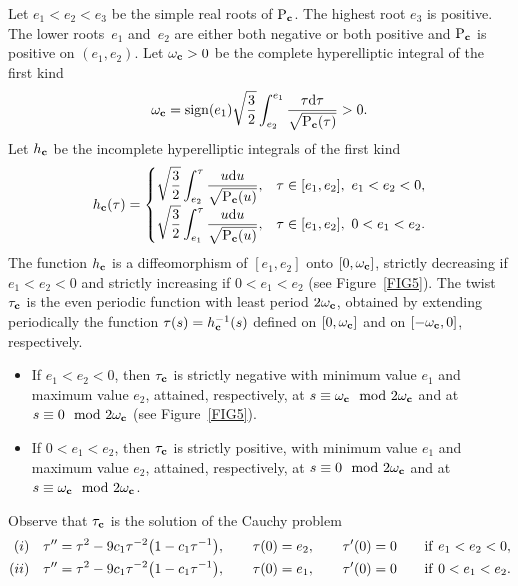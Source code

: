 \documentclass[10pt,a4paper]{amsart}
\numberwithin{equation}{section}
\begin{document}
Let $e_1<e_2<e_3$ be the simple real roots of ${\rm P}_{{\bf c}}$. The highest root $e_3$ is positive.
The lower roots~$e_1$ and~$e_2$ are either both negative or both positive and ${\rm P}_{{\bf c}}$ is positive on $(e_1,e_2)$.
Let $\omega_{{\bf c}}>0$ be the complete hyperelliptic integral of the first kind
\begin{equation}\label{halfpB1}
 \omega_{{\bf c}} ={\rm sign}(e_1) \sqrt{\frac{3}{2}}\int_{e_2}^{e_1}\frac{\tau {\rm d}\tau}{\sqrt{{\rm P}_{{\bf c}}(\tau)}}>0.
 \end{equation}
Let $h_{{\bf c}}$ be the incomplete hyperelliptic integrals of the first kind
\[
 h_{{\bf c}}(\tau) =
\begin{cases} \displaystyle \sqrt{\frac{3}{2}}\int_{e_2}^{\tau}\frac{u{\rm d}u}{\sqrt{{\rm P}_{{\bf c}}(u)}}, & \tau\in [e_1,e_2], \ e_1<e_2<0,\\
 \displaystyle \sqrt{\frac{3}{2}}\int_{e_1}^{\tau}\frac{u {\rm d}u}{\sqrt{{\rm P}_{{\bf c}}(u)}},& \tau\in [e_1,e_2],\  0<e_1<e_2.
\end{cases}
 \]
The function $h_{{\bf c}}$ is a diffeomorphism of $[e_1,e_2]$ onto $[0,\omega_{{\bf c}}]$, strictly decreasing if $e_1<e_2<0$ and strictly
increasing if $0<e_1<e_2$ (see Figure~\ref{FIG5}). The twist $\tau_{{\bf c}}$ is the even periodic function with least period $2\omega_{{\bf c}}$, {obtained by extending periodically the function
$\tau(s) = h_{{\bf c}}^{-1}(s)$ defined on $[0,\omega_{{\bf c}}]$ and on $[-\omega_{{\bf c}},0]$, respectively.}
\begin{itemize}\itemsep=0pt
\item If $e_1<e_2<0$, then $\tau_{{\bf c}}$ is strictly negative with minimum value $e_1$ and maximum value $e_2$, attained, respectively, at $s\equiv \omega_{{\bf c}}\mod 2\omega_{{\bf c}}$ and at $s\equiv 0\mod 2\omega_{{\bf c}}$ (see Figure~\ref{FIG5}).
\item If $0<e_1<e_2$, then $\tau_{{\bf c}}$ is strictly positive, with minimum value $e_1$ and maximum value $e_2$, attained, respectively, {at} $s\equiv 0\mod 2\omega_{{\bf c}}$ and at $s\equiv \omega_{{\bf c}}\mod 2\omega_{{\bf c}}$.
\end{itemize}
Observe that $\tau_{{\bf c}}$ is the solution of the Cauchy problem
\begin{gather}\label{twistnB1'}
\begin{split}
(i)\quad &{\tau''}=\tau^2-9c_1\tau^{-2}\big(1-c_1\tau^{-1}\big),\qquad \tau(0)=e_2,\qquad {\tau'}(0)=0 \qquad {\rm if}\ e_1<e_2<0,\\
(ii)\quad &{\tau''}=\tau^2-9c_1\tau^{-2}\big(1-c_1\tau^{-1}\big),\qquad \tau(0)=e_1,\qquad {\tau'}(0)=0 \qquad {\rm if}\ 0<e_1<e_2.
 \end{split}
 \end{gather}
\end{document}
